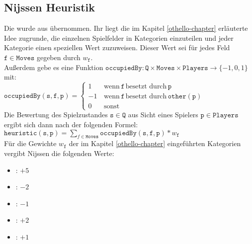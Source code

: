 \subsection{Nijssen Heuristik}
\label{nissen2007H}
Die  wurde aus \cite{nijssen_2007} übernommen. Ihr liegt die im Kapitel \ref{othello-chapter} erläuterte Idee zugrunde, die einzelnen Spielfelder in Kategorien einzuteilen und jeder Kategorie einen speziellen Wert zuzuweisen. Dieser Wert sei für jedes Feld $\mathtt{f} \in \mathtt{Moves}$ gegeben durch $w_{\mathtt{f}}$. 
\\Außerdem gebe es eine Funktion $\mathtt{occupiedBy}: \mathtt{Q} \times \mathtt{Moves} \times \mathtt{Players} \rightarrow \{-1, 0, 1 \}$ mit:
\\$\mathtt{occupiedBy}(\mathtt{s}, \mathtt{f}, \mathtt{p}) = \begin{cases}
1 & \, \text{wenn}\, \mathtt{f}\, \text{besetzt durch}\, \mathtt{p} \\
-1 & \, \text{wenn}\, \mathtt{f}\, \text{besetzt durch}\, \mathtt{other}(\mathtt{p}) \\
0 & \, \text{sonst}
\end{cases}$
\\Die Bewertung des Spielzustandes $\mathtt{s} \in \mathtt{Q}$ aus Sicht eines Spielers $\mathtt{p} \in \mathtt{Players}$ ergibt sich dann nach der folgenden Formel:  \vspace{0.25cm}\\ $\mathtt{heuristic}(\mathtt{s}, \mathtt{p}) = \sum\limits_{f \in \mathtt{Moves}}  \mathtt{occupiedBy}(\mathtt{s}, \mathtt{f}, \mathtt{p}) * w_{\mathtt{f}}$
\vspace{0.25cm}
\\Für die Gewichte $w_{\mathtt{f}}$ der im Kapitel \ref{othello-chapter} eingeführten Kategorien vergibt Nijssen die folgenden Werte:
\begin{itemize}
\item {}: $+5$
\item {}: $-2$
\item {}: $-1$
\item {}: $+2$
\item {}: $+1$
\end{itemize}
